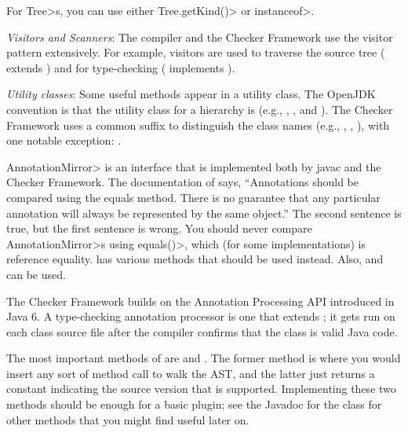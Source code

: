 For \<Tree>s, you can use either \<Tree.getKind()> or \<instanceof>.

\emph{Visitors and Scanners}:
The compiler and the Checker Framework use the visitor pattern
extensively. For example, visitors are used to traverse the source tree
( extends
) and for type-checking
( implements
).

\emph{Utility classes}:
Some useful methods appear in a utility class.  The OpenJDK convention is that
the utility class for a  hierarchy is  (e.g.,
, , and
).  The Checker Framework uses a common
 suffix to distinguish the class names (e.g., ,
, ), with one
notable exception: .



\<AnnotationMirror> is an interface that is implemented both by javac and
the Checker Framework. The documentation of
 says, ``Annotations should be
compared using the equals method. There is no guarantee that any particular
annotation will always be represented by the same object.''  The second
sentence is true, but the first sentence is wrong.  You should never
compare \<AnnotationMirror>s using \<equals()>, which (for some
implementations) is reference equality.
 has various
methods that should be used instead. Also,
 and
 can be used.



The Checker Framework builds on the Annotation Processing API
introduced in Java 6.  A type-checking annotation processor is one that extends
; it gets run on each class
source file after the compiler confirms that the class is valid Java code.

The most important methods of 
are  and . The former
method is where you would insert any sort of method call to walk the AST\@,
and the latter just returns a constant indicating the source version that is
supported. Implementing these two methods should be enough
for a basic plugin; see the Javadoc for the class for other methods that
you might find useful later on.


